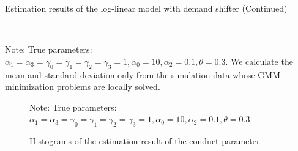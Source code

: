 \documentclass[11pt, a4paper]{article}
\begin{document}
\begin{table}[!htbp]
    \ContinuedFloat  
        \begin{center}
            \caption{Estimation results of the log-linear model with demand shifter (Continued)}
            \label{tb:loglinear_loglinear_sigma_0.001_separate_non_constraint} 
            \subfloat[$\sigma=1.0$]{}\\
            \subfloat[$\sigma=2.0$]{}
        \end{center}\footnotesize
    Note: True parameters: $\alpha_1 = \alpha_3 = \gamma_0 = \gamma_1 = \gamma_2  = \gamma_3 = 1, \alpha_0 = 10, \alpha_2 = 0.1,  \theta = 0.3.$ We calculate the mean and standard deviation only from the simulation data whose GMM minimization problems are locally solved. 
\end{table} 

\begin{figure}[!htbp]
  \begin{center}
  \caption{Histograms of the estimation result of the conduct parameter.}
  \label{fg:histogram_loglinear_loglinear_no_constraint} 
  \end{center}
  \footnotesize
  Note: True parameters: $\alpha_1 = \alpha_3 = \gamma_0 = \gamma_1 = \gamma_2  = \gamma_3 = 1, \alpha_0 = 10, \alpha_2 = 0.1,  \theta = 0.3.$
\end{figure}
\end{document}
